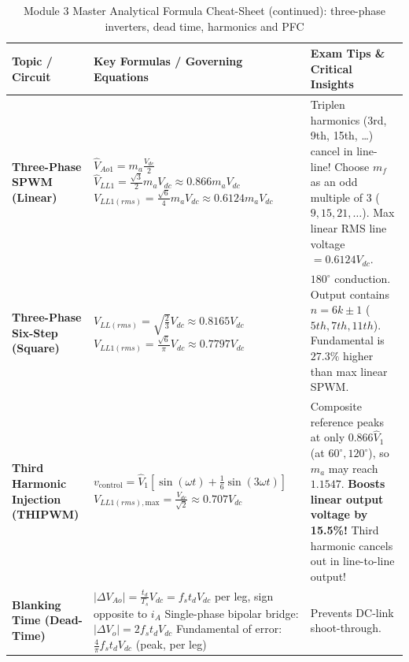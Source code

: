 \documentclass[11pt,a4paper]{article}
\begin{document}
\begin{table}[htbp]
\centering
\small
\caption{Module 3 Master Analytical Formula Cheat-Sheet (continued): three-phase inverters, dead time, harmonics and PFC}
\label{tab:module3_master_formulas_b}
\begin{tabularx}{\textwidth}{l p{5.5cm} X}
\toprule
\textbf{Topic / Circuit} & \textbf{Key Formulas / Governing Equations} & \textbf{Exam Tips \& Critical Insights} \\
\midrule
\textbf{Three-Phase SPWM (Linear)} &
$\hat{V}_{Ao1} = m_a \frac{V_{dc}}{2}$ \newline
$\hat{V}_{LL1} = \frac{\sqrt{3}}{2} m_a V_{dc} \approx 0.866 m_a V_{dc}$ \newline
$V_{LL1(rms)} = \frac{\sqrt{6}}{4} m_a V_{dc} \approx 0.6124 m_a V_{dc}$ &
Triplen harmonics (3rd, 9th, 15th, \dots) cancel in line-line! \newline
Choose $m_f$ as an odd multiple of 3 ($9, 15, 21, \dots$). \newline
Max linear RMS line voltage $= 0.6124 V_{dc}$. \\
\midrule
\textbf{Three-Phase Six-Step (Square)} &
$V_{LL(rms)} = \sqrt{\frac{2}{3}}V_{dc} \approx 0.8165 V_{dc}$ \newline
$V_{LL1(rms)} = \frac{\sqrt{6}}{\pi}V_{dc} \approx 0.7797 V_{dc}$ &
$180^\circ$ conduction. Output contains $n=6k \pm 1$ ($5th, 7th, 11th$). \newline
Fundamental is $27.3\%$ higher than max linear SPWM. \\
\midrule
\textbf{Third Harmonic Injection (THIPWM)} &
$v_{\text{control}} = \hat{V}_1 [\sin(\omega t) + \frac{1}{6}\sin(3\omega t)]$ \newline
$V_{LL1(rms),\text{max}} = \frac{V_{dc}}{\sqrt{2}} \approx 0.707 V_{dc}$ &
Composite reference peaks at only $0.866\hat{V}_1$ (at $60^\circ, 120^\circ$), so $m_a$ may reach $1.1547$. \newline
\textbf{Boosts linear output voltage by 15.5\%!} \newline
Third harmonic cancels out in line-to-line output! \\
\midrule
\textbf{Blanking Time (Dead-Time)} &
$|\Delta V_{Ao}| = \frac{t_d}{T_s}V_{dc} = f_s t_d V_{dc}$ per leg, sign opposite to $i_A$ \newline
Single-phase bipolar bridge: $|\Delta V_o| = 2 f_s t_d V_{dc}$ \newline
Fundamental of error: $\frac{4}{\pi} f_s t_d V_{dc}$ (peak, per leg) &
Prevents DC-link shoot-through. \newline

\end{tabularx}
\end{table}
\end{document}
